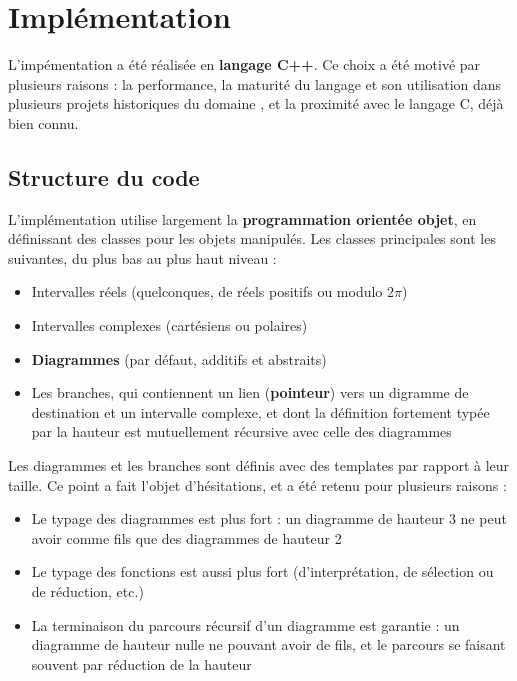 
\chapter{Implémentation}
\label{ch:Implementation}

L'impémentation a été réalisée en \textbf{langage C++}. Ce choix a été motivé par plusieurs raisons : la performance, la maturité du langage et son utilisation dans plusieurs projets historiques du domaine \cite{Bichsel_2023}, et la proximité avec le langage C, déjà bien connu.

\section{Structure du code}

L'implémentation utilise largement la \textbf{programmation orientée objet}, en définissant des classes pour les objets manipulés. Les classes principales sont les suivantes, du plus bas au plus haut niveau :
\begin{itemize}
  \item Intervalles réels (quelconques, de réels positifs ou modulo $2\pi$)
  \item Intervalles complexes (cartésiens ou polaires)
  \item \textbf{Diagrammes} (par défaut, additifs et abstraits)
  \item Les branches, qui contiennent un lien (\textbf{pointeur}) vers un digramme de destination et un intervalle complexe, et dont la définition fortement typée par la hauteur est mutuellement récursive avec celle des diagrammes
\end{itemize}

Les diagrammes et les branches sont définis avec des templates par rapport à leur taille. Ce point a fait l'objet d'hésitations, et a été retenu pour plusieurs raisons :
\begin{itemize}
  \item Le typage des diagrammes est plus fort : un diagramme de hauteur 3 ne peut avoir comme fils que des diagrammes de hauteur 2
  \item Le typage des fonctions est aussi plus fort (d'interprétation, de sélection ou de réduction, etc.)
  \item La terminaison du parcours récursif d'un diagramme est garantie : un diagramme de hauteur nulle ne pouvant avoir de fils, et le parcours se faisant souvent par réduction de la hauteur
\end{itemize}

